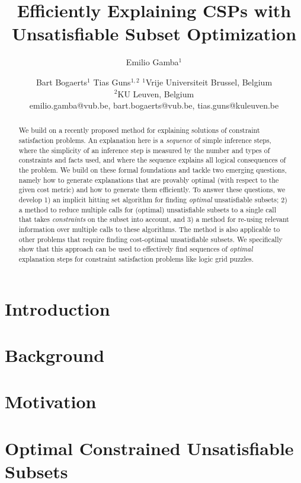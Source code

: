 \documentclass{article}
\title{Efficiently Explaining CSPs with Unsatisfiable Subset Optimization}
\author{
	Emilio Gamba$^1$ \and Bart Bogaerts$^1$ \And Tias Guns$^{1,2}$
	\affiliations
	$^1$Vrije Universiteit Brussel, Belgium\\
	$^2$KU Leuven, Belgium\\
	\emails
	emilio.gamba@vub.be, bart.bogaerts@vub.be,
	tias.guns@kuleuven.be
}
\begin{document}
 
\maketitle

\begin{abstract}
We build on a recently proposed method for explaining solutions of constraint satisfaction problems.
An explanation here is a \textit{sequence} of simple inference steps, where the simplicity of an inference step is measured by the number and types of constraints and facts used, and where the sequence explains all logical consequences of the problem. 
We build on these formal foundations and tackle two emerging questions, namely how to generate explanations that are provably optimal (with respect to the given cost metric) and how to generate them efficiently. 
To answer these questions, we develop 1) an implicit hitting set algorithm for finding \textit{optimal} unsatisfiable subsets; 2) a method to reduce multiple calls for (optimal) unsatisfiable subsets to a single call that takes \emph{constraints} on the subset into account, and 3) a method for re-using relevant information over multiple calls to these algorithms. 
The method is also applicable to other problems that require finding cost-optimal unsatisfiable subsets.
We specifically show that this approach can be used to effectively find sequences of \textit{optimal} explanation steps for constraint satisfaction problems like logic grid puzzles.
\end{abstract}

\section{Introduction}


\section{Background}\label{sec:backgr}\label{sec:background}


\section{Motivation}\label{sec:motivation}\label{sec:motviation}


\section{Optimal Constrained Unsatisfiable Subsets} \label{sec:ocus}

\end{document}
